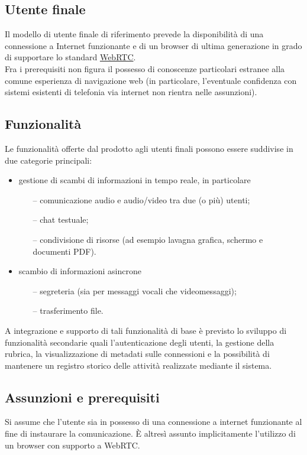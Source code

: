 \subsection{Utente finale}
Il modello di utente finale di riferimento prevede la disponibilità di una connessione a Internet funzionante e di un browser di ultima generazione in grado di supportare lo standard \underline{WebRTC}.\\
Fra i prerequisiti non figura il possesso di conoscenze particolari estranee alla comune esperienza di navigazione web (in particolare, l'eventuale confidenza con sistemi esistenti di telefonia via internet non rientra nelle assunzioni).

\subsection{Funzionalità}
Le funzionalità offerte dal prodotto agli utenti finali possono essere suddivise in due categorie principali:
\begin{itemize}
  \item gestione di scambi di informazioni in tempo reale, in particolare
  \begin{itemize}
  \item[--] comunicazione audio e audio/video tra due (o più) utenti;
  \item[--] chat testuale;
  \item[--] condivisione di risorse (ad esempio lavagna grafica, schermo e documenti PDF). 
  \end{itemize}
  \item scambio di informazioni asincrone 
  \begin{itemize}
  \item[--] segreteria (sia per messaggi vocali che videomessaggi);
  \item[--] trasferimento file.
  \end{itemize}
\end{itemize}
A integrazione e supporto di tali funzionalità di base è previsto lo sviluppo di funzionalità secondarie quali l'autenticazione degli utenti, la gestione della rubrica, la visualizzazione di metadati sulle connessioni e la possibilità di mantenere un registro storico delle attività realizzate mediante il sistema.

\subsection{Assunzioni e prerequisiti}
Si assume che l'utente sia in possesso di una connessione a internet funzionante al fine di instaurare la comunicazione. È altresì assunto implicitamente l'utilizzo di un browser con supporto a WebRTC.

